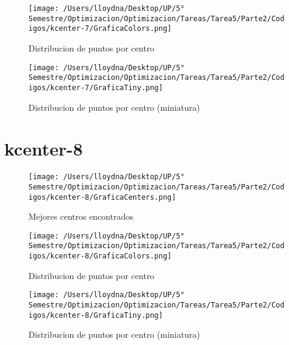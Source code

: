 \documentclass{report}
\begin{document}
        \begin{figure}[H]
            \texttt{[image: /Users/lloydna/Desktop/UP/5° Semestre/Optimizacion/Optimizacion/Tareas/Tarea5/Parte2/Codigos/kcenter-7/GraficaColors.png]}
            \caption{Distribucion de puntos por centro}
            \label{fig:kc72}
        \end{figure}

        \begin{figure}[H]
            \texttt{[image: /Users/lloydna/Desktop/UP/5° Semestre/Optimizacion/Optimizacion/Tareas/Tarea5/Parte2/Codigos/kcenter-7/GraficaTiny.png]}
            \caption{Distribucion de puntos por centro (miniatura)}
            \label{fig:kc73}
        \end{figure}

    \pagebreak

    \section{kcenter-8}
        \begin{figure}[H]
            \texttt{[image: /Users/lloydna/Desktop/UP/5° Semestre/Optimizacion/Optimizacion/Tareas/Tarea5/Parte2/Codigos/kcenter-8/GraficaCenters.png]}
            \caption{Mejores centros encontrados}
            \label{fig:kc81}
        \end{figure}

        \begin{figure}[H]
            \texttt{[image: /Users/lloydna/Desktop/UP/5° Semestre/Optimizacion/Optimizacion/Tareas/Tarea5/Parte2/Codigos/kcenter-8/GraficaColors.png]}
            \caption{Distribucion de puntos por centro}
            \label{fig:kc82}
        \end{figure}

        \begin{figure}[H]
            \texttt{[image: /Users/lloydna/Desktop/UP/5° Semestre/Optimizacion/Optimizacion/Tareas/Tarea5/Parte2/Codigos/kcenter-8/GraficaTiny.png]}
            \caption{Distribucion de puntos por centro (miniatura)}
            \label{fig:kc83}
        \end{figure}

    \pagebreak
\end{document}
